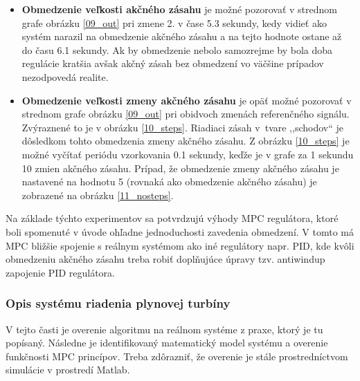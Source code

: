 \begin{itemize}
  \item \textbf{Obmedzenie veľkosti akčného zásahu} je možné pozorovať v strednom grafe obrázku \ref{09_out} pri zmene 2. v čase 5.3 sekundy, kedy vidieť ako systém narazil na obmedzenie akčného zásahu a na tejto hodnote ostane až do času 6.1 sekundy. Ak by obmedzenie nebolo samozrejme by bola doba regulácie kratšia avšak akčný zásah bez obmedzení vo väčšine prípadov nezodpovedá realite.
  \item \textbf{Obmedzenie veľkosti zmeny akčného zásahu} je opäť možné pozorovať v strednom grafe obrázku \ref{09_out} pri obidvoch zmenách referenčného signálu. Zvýraznené to je v obrázku \ref{10_steps}. Riadiaci zásah v~tvare ,,schodov`` je dôsledkom tohto obmedzenia zmeny akčného zásahu. Z obrázku \ref{10_steps} je možné vyčítať periódu vzorkovania 0.1 sekundy, keďže je v grafe za 1 sekundu 10 zmien akčného zásahu. Prípad, že obmedzenie zmeny akčného zásahu je nastavené na hodnotu 5 (rovnaká ako obmedzenie akčného zásahu) je zobrazené na obrázku \ref{11_nosteps}.
\end{itemize}   


Na základe týchto experimentov sa potvrdzujú výhody MPC regulátora, ktoré boli spomenuté v úvode ohľadne jednoduchosti zavedenia obmedzení. V tomto má MPC bližšie spojenie s reálnym systémom ako iné regulátory napr. PID, kde kvôli obmedzeniu akčného zásahu treba robiť doplňujúce úpravy tzv. antiwindup zapojenie PID regulátora. 

\subsubsection{Opis systému riadenia plynovej turbíny}
V tejto časti je overenie algoritmu na reálnom systéme z praxe, ktorý je tu popísaný. Následne je identifikovaný matematický model systému a overenie funkčnosti MPC princípov. Treba zdôrazniť, že overenie je stále prostredníctvom simulácie v prostredí Matlab.

